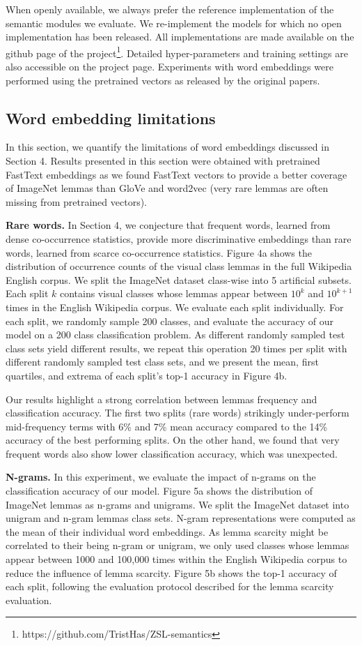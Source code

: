 When openly available, we always prefer the reference implementation of the semantic modules we evaluate. We re-implement the models for which no open implementation has been released. All implementations are made available on the github page of the project\footnote{https://github.com/TristHas/ZSL-semantics}. Detailed hyper-parameters and training settings are also accessible on the project page. Experiments with word embeddings were performed using the pretrained vectors as released by the original papers.

\subsection{ Word embedding limitations }
In this section, we quantify the limitations of word embeddings discussed in Section 4. Results presented in this section were obtained with pretrained FastText embeddings as we found FastText vectors to provide a better coverage of ImageNet lemmas than GloVe and word2vec (very rare lemmas are often missing from pretrained vectors).

\textbf{Rare words.} In Section 4, we conjecture that frequent words, learned from dense co-occurrence statistics, provide more discriminative embeddings than rare words, learned from scarce co-occurrence statistics. Figure 4a shows the distribution of occurrence counts of the visual class lemmas in the full Wikipedia English corpus. We split the ImageNet dataset class-wise into 5 artificial subsets. Each split $k$ contains visual classes whose lemmas appear between $10^k$ and $10^{k+1}$ times in the English Wikipedia corpus. We evaluate each split individually. For each split, we randomly sample 200 classes, and evaluate the accuracy of our model on a 200 class classification problem. As different randomly sampled test class sets yield different results, we repeat this operation 20 times per split with different randomly sampled test class sets, and we present the mean, first quartiles, and extrema of each split's top-1 accuracy in Figure 4b. 

Our results highlight a strong correlation between lemmas frequency and classification accuracy. The first two splits (rare words) strikingly under-perform mid-frequency terms with 6\% and 7\% mean accuracy compared to the 14\% accuracy of the best performing splits. On the other hand, we found that very frequent words also show lower classification accuracy, which was unexpected.

\textbf{N-grams.} In this experiment, we evaluate the impact of n-grams on the classification accuracy of our model. Figure 5a shows the distribution of ImageNet lemmas as n-grams and unigrams. We split the ImageNet dataset into unigram and n-gram lemmas class sets. N-gram representations were computed as the mean of their individual word embeddings. As lemma scarcity might be correlated to their being n-gram or unigram, we only used classes whose lemmas appear between 1000 and 100,000 times within the English Wikipedia corpus to reduce the influence of lemma scarcity. Figure 5b shows the top-1 accuracy of each split, following the evaluation protocol described for the lemma scarcity evaluation.
 
